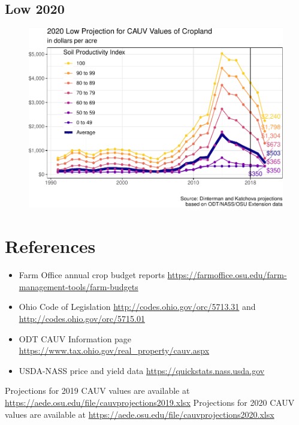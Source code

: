 \documentclass[]{article}
\providecommand{\tightlist}{%
  \setlength{\itemsep}{0pt}\setlength{\parskip}{0pt}}
\begin{document}
\hypertarget{low-2020}{%
\subsection{Low 2020}\label{low-2020}}

\begin{figure}[H]
\includegraphics[width=1\linewidth]{4-projections-2019-2020_files/figure-latex/low-trend-2020-1} \caption{\label{fig:low-trend-2020}}\label{fig:low-trend-2020}
\end{figure}

\hypertarget{references}{%
\section{References}\label{references}}

\begin{itemize}
\tightlist
\item
  Farm Office annual crop budget reports
  \url{https://farmoffice.osu.edu/farm-management-tools/farm-budgets}
\item
  Ohio Code of Legislation \url{http://codes.ohio.gov/orc/5713.31} and
  \url{http://codes.ohio.gov/orc/5715.01}
\item
  ODT CAUV Information page
  \url{https://www.tax.ohio.gov/real_property/cauv.aspx}
\item
  USDA-NASS price and yield data \url{https://quickstats.nass.usda.gov}
\end{itemize}

Projections for 2019 CAUV values are available at
\url{https://aede.osu.edu/file/cauvprojections2019.xlsx} Projections for
2020 CAUV values are available at
\url{https://aede.osu.edu/file/cauvprojections2020.xlsx}
\end{document}
